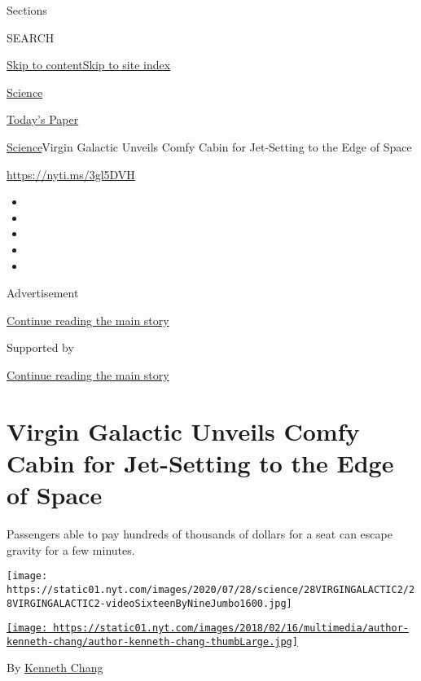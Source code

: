 Sections

SEARCH

\protect\hyperlink{site-content}{Skip to
content}\protect\hyperlink{site-index}{Skip to site index}

\href{https://www.nytimes.com/section/science}{Science}

\href{https://myaccount.nytimes.com/auth/login?response_type=cookie\&client_id=vi}{}

\href{https://www.nytimes.com/section/todayspaper}{Today's Paper}

\href{/section/science}{Science}\textbar{}Virgin Galactic Unveils Comfy
Cabin for Jet-Setting to the Edge of Space

\url{https://nyti.ms/3gl5DVH}

\begin{itemize}
\item
\item
\item
\item
\item
\end{itemize}

Advertisement

\protect\hyperlink{after-top}{Continue reading the main story}

Supported by

\protect\hyperlink{after-sponsor}{Continue reading the main story}

\hypertarget{virgin-galactic-unveils-comfy-cabin-for-jet-setting-to-the-edge-of-space}{%
\section{Virgin Galactic Unveils Comfy Cabin for Jet-Setting to the Edge
of
Space}\label{virgin-galactic-unveils-comfy-cabin-for-jet-setting-to-the-edge-of-space}}

Passengers able to pay hundreds of thousands of dollars for a seat can
escape gravity for a few minutes.

\texttt{[image: https://static01.nyt.com/images/2020/07/28/science/28VIRGINGALACTIC2/28VIRGINGALACTIC2-videoSixteenByNineJumbo1600.jpg]}

\href{https://www.nytimes.com/by/kenneth-chang}{\texttt{[image: https://static01.nyt.com/images/2018/02/16/multimedia/author-kenneth-chang/author-kenneth-chang-thumbLarge.jpg]}}

By \href{https://www.nytimes.com/by/kenneth-chang}{Kenneth Chang}

